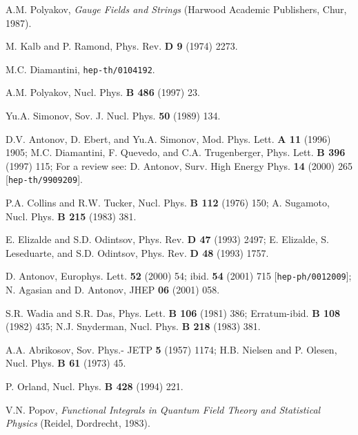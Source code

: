\documentclass[a4paper,12pt]{article}
\begin{document}
\begin{thebibliography}{99}
A.M. Polyakov, {\it Gauge Fields and Strings} (Harwood Academic Publishers, Chur, 1987). 

M. Kalb and P. Ramond, Phys. Rev. {\bf D 9} (1974) 2273.

M.C. Diamantini, {\tt hep-th/0104192}.

A.M. Polyakov, Nucl. Phys. {\bf B 486} (1997) 23.

Yu.A. Simonov, Sov. J. Nucl. Phys. {\bf 50} (1989) 134.

D.V. Antonov, D. Ebert, and Yu.A. Simonov, Mod. Phys. Lett. {\bf A 11} (1996) 1905;
M.C. Diamantini, F. Quevedo, and C.A. Trugenberger, Phys. Lett. {\bf B 396} (1997) 115;
For a review see: D. Antonov, Surv. High Energy Phys. {\bf 14} (2000) 265 [{\tt hep-th/9909209}].

P.A. Collins and R.W. Tucker, Nucl. Phys. {\bf B 112} (1976) 150; 
A. Sugamoto, Nucl. Phys. {\bf B 215} (1983) 381.


E. Elizalde and S.D. Odintsov, Phys. Rev. {\bf D 47} (1993) 2497; 
E. Elizalde, S. Leseduarte, and S.D. Odintsov, Phys. Rev. {\bf D 48} (1993) 1757. 

D. Antonov, Europhys. Lett. {\bf 52} (2000) 54; ibid. {\bf 54} (2001) 715 [{\tt hep-ph/0012009}]; 
N. Agasian and D. Antonov, JHEP {\bf 06} (2001) 058.

S.R. Wadia and S.R. Das, Phys. Lett. {\bf B 106} (1981) 386; 
Erratum-ibid. {\bf B 108} (1982) 435;
N.J. Snyderman, Nucl. Phys. {\bf B 218} (1983) 381.


A.A. Abrikosov, Sov. Phys.- JETP {\bf 5} (1957) 1174;
H.B. Nielsen and P. Olesen, Nucl. Phys. {\bf B 61} (1973) 45.

P. Orland, Nucl. Phys. {\bf B 428} (1994) 221.

V.N. Popov, {\it Functional Integrals in Quantum Field Theory and Statistical Physics} (Reidel, Dordrecht, 1983).


\end{thebibliography}
\end{document}
